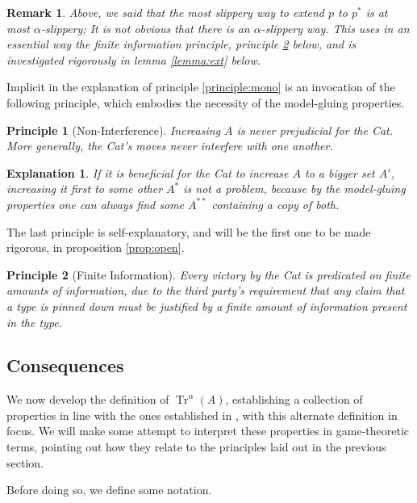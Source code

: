 \documentclass{article}
\newtheorem{remark}[theorem]{Remark}
\newtheorem{principle}{Principle}
\theoremstyle{nonumberplain}
\newtheorem{explanation}{Explanation}
\DeclareMathOperator{\Tr}{Tr}
\begin{document}
\begin{remark}
Above, we said that the most slippery way to extend $p$ to $p^*$ is at most $\alpha$-slippery; It is not obvious that there is an $\alpha$-slippery way. This uses in an essential way the finite information principle, principle \ref{principle:fininfo} below, and is investigated rigorously in lemma \ref{lemma:ext} below.
\end{remark}

Implicit in the explanation of principle \ref{principle:mono} is an invocation of the following principle, which embodies the necessity of the model-gluing properties.

\begin{principle}[Non-Interference]\label{principle:ni}
Increasing $A$ is never prejudicial for the Cat. More generally, the Cat's moves never interfere with one another.
\end{principle}

\begin{explanation}
If it is beneficial for the Cat to increase $A$ to a bigger set $A'$, increasing it first to some other $A^*$ is not a problem, because by the model-gluing properties one can always find some $A^{**}$ containing a copy of both.
\end{explanation}

The last principle is self-explanatory, and will be the first one to be made rigorous, in proposition \ref{prop:open}.

\begin{principle}[Finite Information]\label{principle:fininfo}
Every victory by the Cat is predicated on finite amounts of information, due to the third party's requirement that any claim that a type is pinned down must be justified by a finite amount of information present in the type.
\end{principle}

\subsection{Consequences}

We now develop the definition of $\Tr^\alpha(A)$, establishing a collection of properties in line with the ones established in \cite{morley}, with this alternate definition in focus. We will make some attempt to interpret these properties in game-theoretic terms, pointing out how they relate to the principles laid out in the previous section.

Before doing so, we define some notation.
\end{document}
